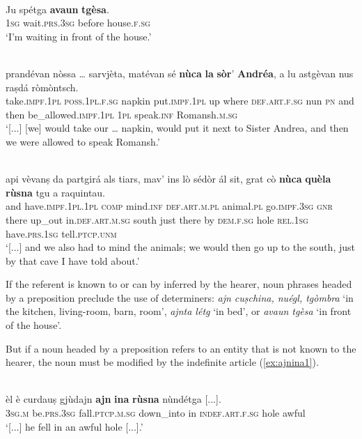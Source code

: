 \ea
\label{}
\\
\gll Ju spétga \textbf{avaun} \textbf{tgèsa}.\\
\textsc{1sg} wait\textsc{.prs.3sg} before house.\textsc{f.sg}\\
\glt `I'm waiting in front of the house.'
\z

\ea
\label{}
\\
\gll [...] prandévan nòssa … sarvjèta, matévan sé \textbf{nùca} \textbf{la} \textbf{sòr}’ \textbf{Andréa}, a lu astgèvan nus raṣdá ròmòntsch.\\
{} take.\textsc{impf.1pl} \textsc{poss.1pl.f.sg} {} napkin put.\textsc{impf.1pl} up  where \textsc{def.art.f.sg} nun \textsc{pn} and then be\_allowed.\textsc{impf.1pl} \textsc{1pl} speak.\textsc{inf} Romansh.\textsc{m.sg}\\
\glt `[...] [we] would take our … napkin, would put it next to Sister Andrea, and then we were allowed to speak Romansh.'
\z

\ea
\label{}
\\
\gll [...] api vèvanṣ da partgirá als tiars, mav’ ins lò sédòr ál sit, grat cò \textbf{nùca} \textbf{quèla} \textbf{rùsna} tgu a raquintau.\\
{} and have.\textsc{impf.1pl.1pl} \textsc{comp} mind.\textsc{inf} \textsc{def.art.m.pl} animal.\textsc{pl} go.\textsc{impf.3sg} \textsc{gnr} there up\_out in.\textsc{def.art.m.sg} south just there by \textsc{dem.f.sg} hole \textsc{rel.1sg} have.\textsc{prs.1sg} tell.\textsc{ptcp.unm}\\  
\glt `[...] and we also had to mind the animals; we would then go up to the south, just by that cave I have told about.'
\z

If the referent is known to or can by inferred by the hearer, noun phrases headed by a preposition preclude the use of determiners: \textit{ajn cuṣchina, nuégl, tgòmbra} `in the kitchen, living-room, barn, room', \textit{ajnta létg} `in bed', or \textit{avaun tgèsa} `in front of the house'.

But if a noun headed by a preposition refers to an entity that is not known to the hearer, the noun must be modified by the indefinite article (\ref{ex:ajnina1}).

\ea
\label{ex:ajnina1}
\\
\gll  [...] èl è curdauṣ gjùdajn \textbf{ajn} \textbf{ina} \textbf{rùsna} nùndétga [...].\\
{} \textsc{3sg.m} be.\textsc{prs.3sg} fall.\textsc{ptcp.m.sg} down\_into in \textsc{indef.art.f.sg} hole awful\\
\glt `[...] he fell in an awful hole [...].'
\z


